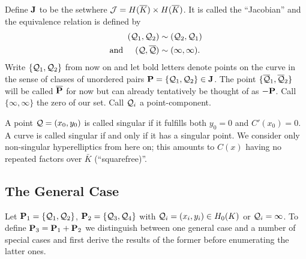 \documentclass[english,11pt,a4paper]{article}
\begin{document}
\begin{defin}\label{defj}
	Define $\J$ to be the set\scalebox{1.3}{ $\nicefrac{ \j }{\sim }$ }where $\j = \ekb \times \ekb$. It is called the ``Jacobian'' and the equivalence relation is defined by
	\begin{align*}
		(\q_1,\q_2) &\sim (\q_2,\q_1) \\
		\text{and\hspace{5mm}} (\q,\bar \q) & \sim ( \infty , \infty ). 
	\end{align*}
	Write $\{ \q_1,\q_2 \}$ from now on and let bold letters denote points on the curve in the sense of classes of unordered pairs $\P =\{ \q_1, \q_2 \} \in \J$. The point $\{ \bar \q_1, \bar \q_2 \}$ will be called $\bar \P$ for now but can already tentatively be thought of as $-\P$. Call $\{ \infty, \infty \}$ the zero of our set. Call $\q_i$ a point-component.%

	A point $\q = (x_0,y_0)$ is called singular if it fulfills both $y_0=0$ and $C'(x_0) = 0$. A curve is called singular if and only if it has a singular point. We consider only non-singular hyperelliptics from here on; this amounts to $C(x)$ having no repeated factors over $\bar K$ (``squarefree)''.%
\end{defin}

\subsection{The General Case}

Let $\P_1 = \{\q_1,\q_2\}$, $\P_2 = \{\q_3,\q_4\}$ with $\q_i = (x_i,y_i) \in \enk$ or $\q_i = \infty$. To define $\P_3 = \P_1 + \P_2$ we distinguish between one general case and a number of special cases and first derive the results of the former before enumerating the latter ones.
\end{document}
